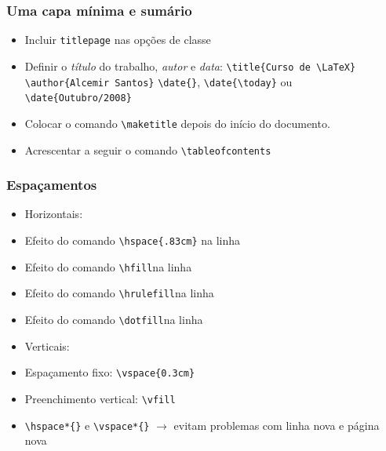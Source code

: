 \begin{frame}[fragile]
\frametitle{Uma capa mínima e sumário}

\begin{itemize}
  \item Incluir \texttt{titlepage} nas opções de classe
  \item Definir o \textit{título} do trabalho, \textit{autor} e \textit{data}: 
\verb|\title{Curso de \LaTeX}|
\verb|\author{Alcemir Santos}|
\verb|\date{}|, \verb|\date{\today}| ou \verb|\date{Outubro/2008}|
  \item Colocar o comando \verb|\maketitle| depois do início do documento.
  \item Acrescentar a seguir o comando \verb|\tableofcontents|
\end{itemize}
 
\end{frame}
\begin{frame}[fragile]
\frametitle{Espaçamentos}

\begin{itemize}
	\item Horizontais:
	\item[] Efeito do comando \verb|\hspace{.83cm}|\hspace{.83cm} na linha
	\item[] Efeito do comando \verb|\hfill|\hfill na linha
	\item[] Efeito do comando \verb|\hrulefill|\hrulefill na linha
	\item[] Efeito do comando \verb|\dotfill|\dotfill na linha
	\item Verticais:
	\item[] Espaçamento fixo: \verb|\vspace{0.3cm}|\vspace{0.3cm}
	\item[] Preenchimento vertical: \verb|\vfill|\vfill
	\item \verb|\hspace*{}| e \verb|\vspace*{}| $\rightarrow$ evitam problemas com linha nova e página
nova
\end{itemize}
 
\end{frame}

